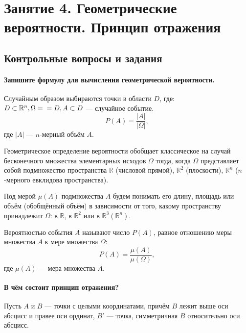 \chapter*{Занятие 4. Геометрические вероятности. Принцип отражения}

\section*{Контрольные вопросы и задания}

\subsubsection*{Запишите формулу для вычисления геометрической вероятности.}

Случайным образом выбираются точки в области $D$, где:
$D \subset \mathbb{R}^n,
\Omega = \\
= D,
A \subset D$
--- случайное событие.
$$P \left( A \right) =
\frac{|A|}{| \Omega |}, $$
где $|A|$ --- $n$-мерный объём $A$.

Геометрическое определение вероятности обобщает классическое на случай бесконечного множества элементарных исходов
$ \Omega $ тогда, когда $ \Omega $ представляет собой подмножество пространства $ \mathbb{R}$ (числовой прямой),
$ \mathbb{R}^2$ (плоскости), $ \mathbb{R}^n$ ($n$-мерного евклидова пространства).

Под мерой $ \mu \left( A \right) $ подмножества $A$ будем понимать его длину,
площадь или объём (обобщённый объём) в зависимости от того,
какому пространству принадлежит $ \Omega $:
в  $ \mathbb{R}$, в $ \mathbb{R}^2$ или в $ \mathbb{R}^3 \left(  \mathbb{R}^n \right) $.

Вероятностью события $A$
называют число $P \left( A \right) $, равное отношению меры множества $A$ к мере множества $ \Omega $:
$$P \left( A \right) =
\frac{ \mu \left( A \right) }{ \mu \left( \Omega \right) },$$
где $ \mu \left( A \right) $ --- мера множества $A$.

\subsubsection*{В чём состоит принцип отражения?}

Пусть $A$ и $B$ --- точки с целыми координатами, причём $B$ лежит выше оси абсцисс и правее оси ординат, $B'$ --- точка, симметричная $B$ относительно оси абсцисс.

